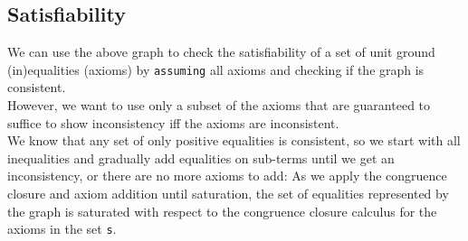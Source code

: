 \subsection{Satisfiability}
We can use the above graph to check the satisfiability of a set of unit ground (in)equalities (axioms) by \lstinline{assuming} all axioms and checking if the graph is consistent.\\
However, we want to use only a subset of the axioms that are guaranteed to suffice to show inconsistency iff the axioms are inconsistent.\\
We know that any set of only positive equalities is consistent, so we start with all inequalities and gradually add equalities on sub-terms until we get an inconsistency, or there are no more axioms to add:
As we apply the congruence closure and axiom addition until saturation, the set of equalities represented by the graph is saturated with respect to the congruence closure calculus for the axioms in the set \lstinline{s}.
